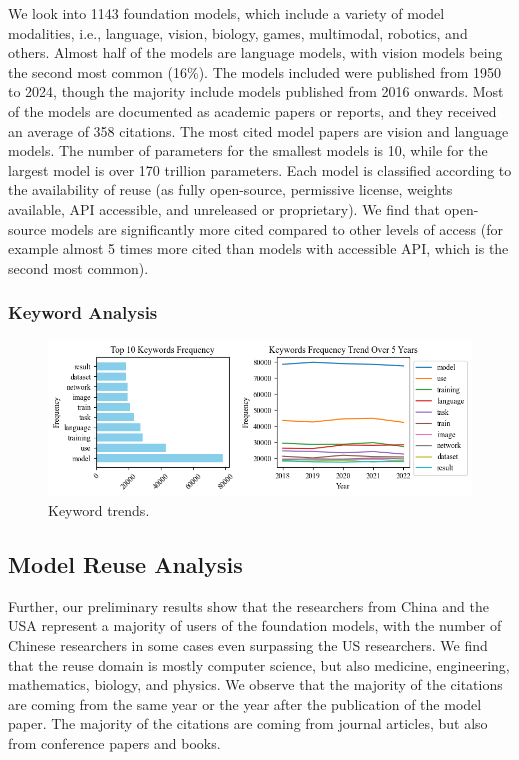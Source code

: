 \documentclass[acmsmall,authorversion]{acmart}
\begin{document}
We look into 1143 foundation models, which include a variety of model modalities, i.e., language, vision, biology, games, multimodal, robotics, and others. Almost half of the models are language models, with vision models being the second most common (16\%). The models included were published from 1950 to 2024, though the majority include models published from 2016 onwards. Most of the models are documented as academic papers or reports, and they received an average of 358 citations. The most cited model papers are vision and language models. The number of parameters for the smallest models is 10, while for the largest model is over 170 trillion parameters. Each model is classified according to the availability of reuse (as fully open-source, permissive license, weights available, API accessible, and unreleased or proprietary). We find that open-source models are significantly more cited compared to other levels of access (for example almost 5 times more cited than models with accessible API, which is the second most common).

\subsubsection{Keyword Analysis}


\begin{figure}
    \centering
    \includegraphics[width=\linewidth]{../figures/keyword_frequencies.png}
    \caption{Keyword trends.}
    \label{fig:keyword-frequencies}
\end{figure}

\subsection{Model Reuse Analysis}

Further, our preliminary results show that the researchers from China and the USA represent a majority of users of the foundation models, with the number of Chinese researchers in some cases even surpassing the US researchers. We find that the reuse domain is mostly computer science, but also medicine, engineering, mathematics, biology, and physics. We observe that the majority of the citations are coming from the same year or the year after the publication of the model paper. The majority of the citations are coming from journal articles, but also from conference papers and books. 
\end{document}
